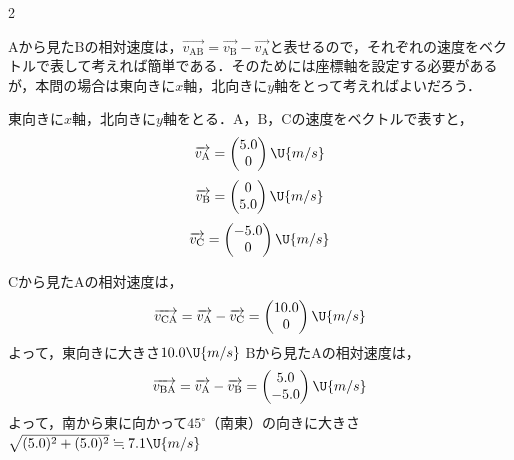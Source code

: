 \begin{multicols}{2}
\begin{sisin}
$\mathrm{A}$から見た$\mathrm{B}$の相対速度は，$\overrightarrow{v_{\mathrm{AB}}}=\overrightarrow{v_{\mathrm{B}}}-\overrightarrow{v_{\mathrm{A}}}$と表せるので，それぞれの速度をベクトルで表して考えれば簡単である．そのためには座標軸を設定する必要があるが，本問の場合は東向きに$x$軸，北向きに$y$軸をとって考えればよいだろう．
\end{sisin}
\par
\hspace{1zw}東向きに$x$軸，北向きに$y$軸をとる．$\mathrm{A}$，$\mathrm{B}$，$\mathrm{C}$の速度をベクトルで表すと，
\[\overrightarrow{v_{\mathrm{A}}}=\begin{pmatrix}5.0\\0\end{pmatrix}\U{m/s}\]
\[\overrightarrow{v_{\mathrm{B}}}=\begin{pmatrix}0\\5.0\end{pmatrix}\U{m/s}\]
\[\overrightarrow{v_{\mathrm{C}}}=\begin{pmatrix}-5.0\\0\end{pmatrix}\U{m/s}\]
\begin{komon}
 $\mathrm{C}$から見た$\mathrm{A}$の相対速度は，
       \[\overrightarrow{v_{\mathrm{CA}}}=\overrightarrow{v_{\mathrm{A}}}-\overrightarrow{v_{\mathrm{C}}}=\begin{pmatrix}10.0\\0\end{pmatrix}\U{m/s}\]
       よって，東向きに大きさ$10.0\U{m/s}$\Ans
{} $\mathrm{B}$から見た$\mathrm{A}$の相対速度は，
       \[\overrightarrow{v_{\mathrm{BA}}}=\overrightarrow{v_{\mathrm{A}}}-\overrightarrow{v_{\mathrm{B}}}=\begin{pmatrix}5.0\\-5.0\end{pmatrix}\U{m/s}\]
       よって，南から東に向かって$45^\circ$（南東）の向きに大きさ$\sqrt{(5.0)^2+(5.0)^2}\fallingdotseq 7.1\U{m/s}$\Ans
\end{komon}


\end{multicols}
